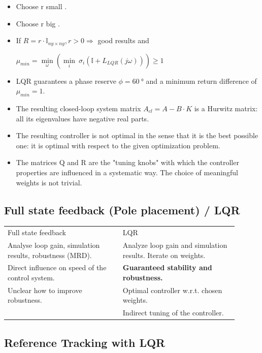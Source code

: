 \documentclass[10pt,a4paper]{scrartcl}
\begin{document}
\begin{multicols*}{3}
	\begin{itemize}
	\compaq
	\item
	Choose r small \dahe {}.
	\item
	Choose r big \dahe {}.
	\item
	If $R=r\cdot\mathbb{I}_{ny\times ny},r>0\Rightarrow$ good results and 
	
	$\mu_{min}=\underset{\omega}{\min}\left(\underset{i}{\min}\ \sigma_i(\mathbb{I}+L_{LQR}(j\omega))\right)\geq 1$
	\vspace{3pt}
	\item
	LQR guarantees a phase reserve $\phi=\SI{60}{\degree}$ and a minimum return difference of $\mu_{min}=1$.
	\item
	The resulting closed-loop system matrix $A_{cl}=A-B\cdot K$ is a Hurwitz matrix: all its eigenvalues have negative real parts.
	\item
	The resulting controller is not optimal in the sense that it is the best possible one: it is optimal with respect to the given optimization problem.
	\item
	The matrices Q and R are the "tuning knobs" with which the controller properties are influenced in a systematic way. The choice of meaningful weights is not trivial.
	\end{itemize}	
	
	\subsection*{Full state feedback (Pole placement) / LQR}
	
	\small
	\begin{tabular}{p{0.45\linewidth}p{0.45\linewidth}}
	Full state feedback & LQR\\
	Analyse loop gain, simulation results, robustness (MRD). & Analyze loop gain and simulation results. Iterate on weights.\\
	Direct influence on speed of the control system.&\textbf{Guaranteed stability and robustness.}\\
	Unclear how to improve robustness.&Optimal controller w.r.t. chosen weights.\\
	& Indirect tuning of the controller.
	\end{tabular}
	\normalsize
	
	\subsection*{Reference Tracking with LQR}
	

\end{multicols*}
\end{document}
